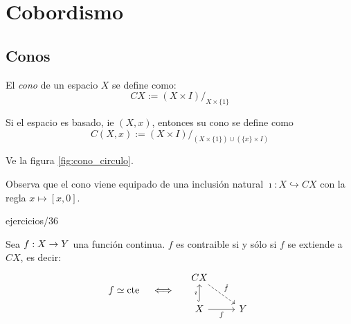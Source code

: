 \documentclass[../../topologia_algebraica]{subfiles}
\begin{document}
\section{Cobordismo}\label{sec:cobordismo}

\subsection{Conos}

\begin{defin}
  El \emph{cono} de un espacio $X$ se define como:
  \[
    CX := (X\times I)/_{X\times\{1\}}
  \] 

  Si el espacio es basado, ie $(X,x)$, entonces su cono se define como
  \[
    C(X,x):=(X\times I)/_{(X\times \{1\})\cup(\{x\}\times I)}
  \]
\end{defin}

 Ve la figura \ref{fig:cono_circulo}.

\begin{nota}
  Observa que el cono viene equipado de una inclusi\'on natural $\imath:X\hookrightarrow CX$ con la
  regla $x\mapsto [x,0]$.
\end{nota}

{ejercicios/36} %

\begin{lema}
  Sea $f:X\rightarrow Y$ una funci\'on continua. $f$ es contraible si y s\'olo si $f$ se extiende a $CX$, es
  decir:
  \[
    f\simeq\cte \quad\iff\quad
    \begin{tikzcd}
      CX \arrow[dr,dashed,"\hat{f}"] & \\
      X \arrow[u,hook,"\imath"] \arrow[r,"f"'] & Y
    \end{tikzcd}
  \]
\end{lema}
\end{document}
